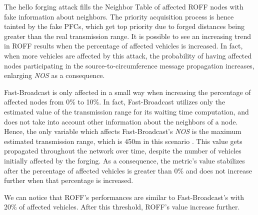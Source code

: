 			The hello forging attack fills the Neighbor Table of affected ROFF nodes with fake information about neighbors. The priority acquisition process is hence tainted by the fake PFCs, which get top priority due to forged distances being greater than the real transmission range. It is possible to see an increasing trend in ROFF results when the percentage of affected vehicles is increased. In fact, when more vehicles are affected by this attack, the probability of having affected nodes participating in the source-to-circumference message propagation increases, enlarging \textit{NOS} as a consequence.
			
			
			Fast-Broadcast is only affected in a small way when increasing the percentage of affected nodes from 0\% to 10\%. In fact, Fast-Broadcast utilizes only the estimated value of the transmission range for its waiting time computation, and does not take into account other information about the neighbors of a node. Hence, the only variable which affects Fast-Broadcast's \textit{NOS} is the maximum estimated transmission range, which is 450m in this scenario . This value gets propagated throughout the network over time, despite the number of vehicles initially affected by the forging. As a consequence, the metric's value stabilizes after the percentage of affected vehicles is greater than 0\% and does not increase further when that percentage is increased.
			
			
			We can notice that ROFF's performances are similar to Fast-Broadcast's with 20\% of affected vehicles. After this threshold, ROFF's value increase further.
		
